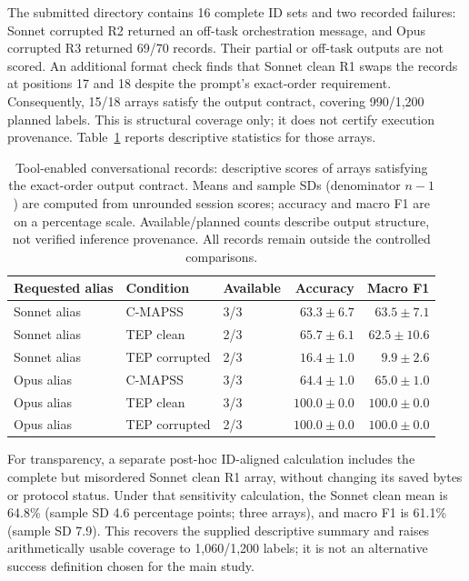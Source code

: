 \documentclass[11pt,a4paper]{article}
\begin{document}
The submitted directory contains 16 complete ID sets and two recorded failures: Sonnet corrupted R2 returned an off-task orchestration message, and Opus corrupted R3 returned 69/70 records. Their partial or off-task outputs are not scored. An additional format check finds that Sonnet clean R1 swaps the records at positions 17 and 18 despite the prompt's exact-order requirement. Consequently, 15/18 arrays satisfy the output contract, covering 990/1,200 planned labels. This is structural coverage only; it does not certify execution provenance. Table~\ref{tab:claude_conversation} reports descriptive statistics for those arrays.

\begin{table}[htbp]
\centering
\small
\caption{Tool-enabled conversational records: descriptive scores of arrays satisfying the exact-order output contract. Means and sample SDs (denominator $n-1$) are computed from unrounded session scores; accuracy and macro F1 are on a percentage scale. Available/planned counts describe output structure, not verified inference provenance. All records remain outside the controlled comparisons.}
\label{tab:claude_conversation}
\begin{tabular}{@{}lllrr@{}}
\toprule
Requested alias & Condition & Available & Accuracy & Macro F1 \\
\midrule
Sonnet alias & C-MAPSS & 3/3 & $63.3 \pm 6.7$ & $63.5 \pm 7.1$ \\
Sonnet alias & TEP clean & 2/3 & $65.7 \pm 6.1$ & $62.5 \pm 10.6$ \\
Sonnet alias & TEP corrupted & 2/3 & $16.4 \pm 1.0$ & $9.9 \pm 2.6$ \\
Opus alias & C-MAPSS & 3/3 & $64.4 \pm 1.0$ & $65.0 \pm 1.0$ \\
Opus alias & TEP clean & 3/3 & $100.0 \pm 0.0$ & $100.0 \pm 0.0$ \\
Opus alias & TEP corrupted & 2/3 & $100.0 \pm 0.0$ & $100.0 \pm 0.0$ \\
\bottomrule
\end{tabular}
\end{table}


For transparency, a separate post-hoc ID-aligned calculation includes the complete but misordered Sonnet clean R1 array, without changing its saved bytes or protocol status. Under that sensitivity calculation, the Sonnet clean mean is 64.8\% (sample SD 4.6 percentage points; three arrays), and macro F1 is 61.1\% (sample SD 7.9). This recovers the supplied descriptive summary and raises arithmetically usable coverage to 1,060/1,200 labels; it is not an alternative success definition chosen for the main study.
\end{document}
